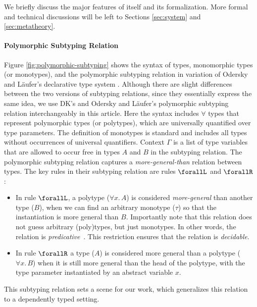 We briefly discuss the major features of \name itself and
its formalization. More formal and technical discussions will be left to
Sections \ref{sec:system} and \ref{sec:metatheory}.

\paragraph{Polymorphic Subtyping Relation}
Figure \ref{fig:polymorphic-subtyping} shows the syntax of types, monomorphic types (or monotypes),
and the polymorphic subtyping relation in \cite{dunfield2013complete} variation of
Odersky and L\"aufer's declarative type system \citep{odersky1996putting}. Although there
are slight differences between the two versions of subtyping relations, since they essentially express
the same idea, we use DK's and Odersky and L\"aufer's polymorphic subtyping relation interchangeably
in this article.
Here the syntax includes $\forall$ types that represent polymorphic types (or polytypes),
which are universally quantified over type parameters. The definition of monotypes
is standard and includes all types without occurrences of universal quantifiers.
Context $\Gamma$ is a list of type variables that are allowed to occur free in types
$A$ and $B$ in the subtyping relation.
The polymorphic subtyping relation captures a \emph{more-general-than} relation
between types. The key rules in their subtyping relation are rules $\forallL$
and $\forallR$:

\begin{itemize}
  \item In rule $\forallL$, a polytype ($\forall x.\, A$) is considered \emph{more-general}
        than another type ($B$), when we can find an arbitrary monotype ($\tau$)
        so that the instantiation is more general than $B$.
        Importantly note that this relation does not guess arbitrary (poly)types,
        but just monotypes. In other words, the relation is \emph{predicative}~\citep{Martin-Lof-1972}.
        This restriction ensures that the relation is \emph{decidable}.

  \item In rule $\forallR$ a type ($A$) is considered more general than a polytype ($\forall x.\, B$)
        when it is still more general than the head of the polytype, with the type
        parameter instantiated by an abstract variable $x$.
\end{itemize}

This subtyping relation sets a scene for our work, which
generalizes this relation to a dependently typed setting.

